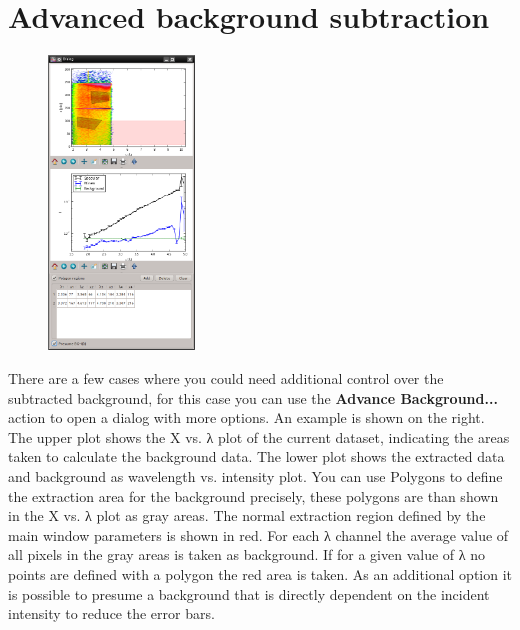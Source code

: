   \section{Advanced background subtraction}
    \begin{figure}
    \centering 
    \includegraphics[width=110pt]{screenshots/advancedBackground.png}
    \end{figure}
    There are a few cases where you could need additional control over the subtracted background, for this case you can use the \textbf{Advance Background...} action to open a dialog with more options.
    An example is shown on the right. 
    The upper plot shows the X vs. λ plot of the current dataset, indicating the areas taken to calculate the background data.
    The lower plot shows the extracted data and background as wavelength vs. intensity plot.
    You can use Polygons to define the extraction area for the background precisely, these polygons are than shown in the X vs. λ plot as gray areas. 
    The normal extraction region defined by the main window parameters is shown in red. 
    For each λ channel the average value of all pixels in the gray areas is taken as background. 
    If for a given value of λ no points are defined with a polygon the red area is taken.
    As an additional option it is possible to presume a background that is directly dependent on the incident intensity to reduce the error bars.
  
